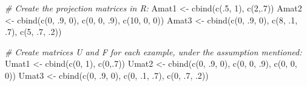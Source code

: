 \documentclass[
]{book}
\newenvironment{Shaded}{\begin{snugshade}}{\end{snugshade}}
\newcommand{\CommentTok}[1]{\textcolor[rgb]{0.56,0.35,0.01}{\textit{#1}}}
\newcommand{\DecValTok}[1]{\textcolor[rgb]{0.00,0.00,0.81}{#1}}
\newcommand{\FunctionTok}[1]{\textcolor[rgb]{0.00,0.00,0.00}{#1}}
\newcommand{\NormalTok}[1]{#1}
\newcommand{\OtherTok}[1]{\textcolor[rgb]{0.56,0.35,0.01}{#1}}
\begin{document}
\begin{Shaded}
\begin{Highlighting}[]
\CommentTok{\# Create the projection matrices in R:}
\NormalTok{Amat1 }\OtherTok{\textless{}{-}} \FunctionTok{cbind}\NormalTok{(}\FunctionTok{c}\NormalTok{(.}\DecValTok{5}\NormalTok{, }\DecValTok{1}\NormalTok{), }\FunctionTok{c}\NormalTok{(}\DecValTok{2}\NormalTok{,.}\DecValTok{7}\NormalTok{))}
\NormalTok{Amat2 }\OtherTok{\textless{}{-}} \FunctionTok{cbind}\NormalTok{(}\FunctionTok{c}\NormalTok{(}\DecValTok{0}\NormalTok{, .}\DecValTok{9}\NormalTok{, }\DecValTok{0}\NormalTok{), }\FunctionTok{c}\NormalTok{(}\DecValTok{0}\NormalTok{, }\DecValTok{0}\NormalTok{, .}\DecValTok{9}\NormalTok{), }\FunctionTok{c}\NormalTok{(}\DecValTok{10}\NormalTok{, }\DecValTok{0}\NormalTok{, }\DecValTok{0}\NormalTok{))}
\NormalTok{Amat3 }\OtherTok{\textless{}{-}} \FunctionTok{cbind}\NormalTok{(}\FunctionTok{c}\NormalTok{(}\DecValTok{0}\NormalTok{, .}\DecValTok{9}\NormalTok{, }\DecValTok{0}\NormalTok{), }\FunctionTok{c}\NormalTok{(}\DecValTok{8}\NormalTok{, .}\DecValTok{1}\NormalTok{, .}\DecValTok{7}\NormalTok{), }\FunctionTok{c}\NormalTok{(}\DecValTok{5}\NormalTok{, .}\DecValTok{7}\NormalTok{, .}\DecValTok{2}\NormalTok{))}

\CommentTok{\# Create matrices U and F for each example, under the assumption mentioned:}
\NormalTok{Umat1 }\OtherTok{\textless{}{-}} \FunctionTok{cbind}\NormalTok{(}\FunctionTok{c}\NormalTok{(}\DecValTok{0}\NormalTok{, }\DecValTok{1}\NormalTok{), }\FunctionTok{c}\NormalTok{(}\DecValTok{0}\NormalTok{,.}\DecValTok{7}\NormalTok{))}
\NormalTok{Umat2 }\OtherTok{\textless{}{-}} \FunctionTok{cbind}\NormalTok{(}\FunctionTok{c}\NormalTok{(}\DecValTok{0}\NormalTok{, .}\DecValTok{9}\NormalTok{, }\DecValTok{0}\NormalTok{), }\FunctionTok{c}\NormalTok{(}\DecValTok{0}\NormalTok{, }\DecValTok{0}\NormalTok{, .}\DecValTok{9}\NormalTok{), }\FunctionTok{c}\NormalTok{(}\DecValTok{0}\NormalTok{, }\DecValTok{0}\NormalTok{, }\DecValTok{0}\NormalTok{))}
\NormalTok{Umat3 }\OtherTok{\textless{}{-}} \FunctionTok{cbind}\NormalTok{(}\FunctionTok{c}\NormalTok{(}\DecValTok{0}\NormalTok{, .}\DecValTok{9}\NormalTok{, }\DecValTok{0}\NormalTok{), }\FunctionTok{c}\NormalTok{(}\DecValTok{0}\NormalTok{, .}\DecValTok{1}\NormalTok{, .}\DecValTok{7}\NormalTok{), }\FunctionTok{c}\NormalTok{(}\DecValTok{0}\NormalTok{, .}\DecValTok{7}\NormalTok{, .}\DecValTok{2}\NormalTok{))}


\end{Highlighting}
\end{Shaded}
\end{document}
